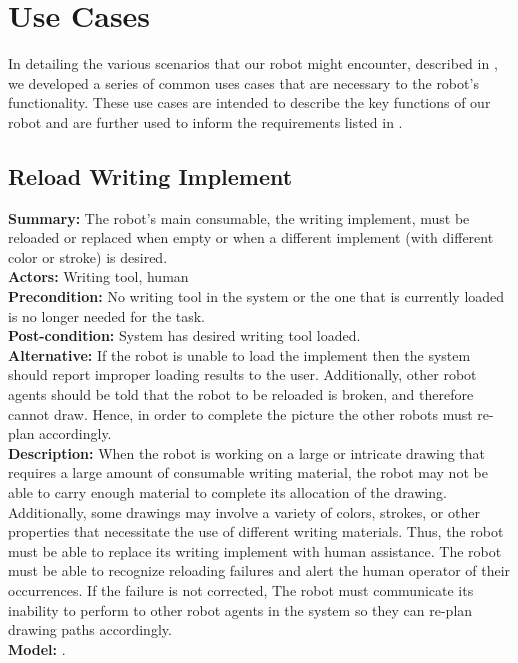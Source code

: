 
\section{Use Cases}
\label{sec:use_cases}
In detailing the various scenarios that our robot might encounter, described in , we developed a series of common uses cases that are necessary to the robot's functionality. These use cases are intended to describe the key functions of our robot and are further used to inform the requirements listed in .


\subsection{Reload Writing Implement}
\textbf{Summary:} The robot's main consumable, the writing implement, must be reloaded or replaced when empty or when a different implement (with different color or stroke) is desired. \\
\textbf{Actors:}  Writing tool, human \\
\textbf{Precondition:} No writing tool in the system or the one that is currently loaded is no longer needed for the task. \\
\textbf{Post-condition:} System has desired writing tool loaded. \\
\textbf{Alternative:} If the robot is unable to load the implement then the system should report improper loading results to the user. Additionally, other robot agents should be told that the robot to be reloaded is broken, and therefore cannot draw. Hence, in order to complete the picture the other robots must re-plan accordingly. \\
\textbf{Description:} When the robot is working on a large or intricate drawing that requires a large amount of consumable writing material, the robot may not be able to carry enough material to complete its allocation of the drawing. Additionally, some drawings may involve a variety of colors, strokes, or other properties that necessitate the use of different writing materials. Thus, the robot must be able to replace its writing implement with human assistance. The robot must be able to recognize reloading failures and alert the human operator of their occurrences. If the failure is not corrected, The robot must communicate its inability to perform to other robot agents in the system so they can re-plan drawing paths accordingly. \\
\textbf{Model:} .\\
